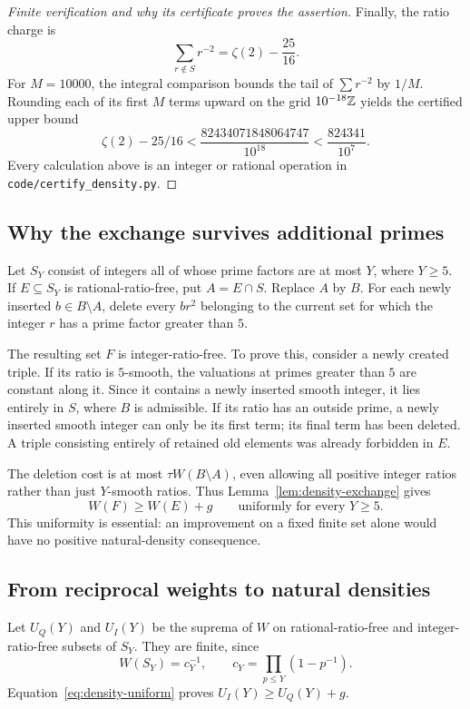 \begin{proof}[Finite verification and why its certificate proves the assertion]
Finally, the ratio charge is
\[
 \sum_{r\notin S}r^{-2}=\zeta(2)-\frac{25}{16}.
\]
For $M=10000$, the integral comparison bounds the tail of
$\sum r^{-2}$ by $1/M$. Rounding each of its first $M$ terms upward on
the grid $10^{-18}\mathbb Z$ yields the certified upper bound
\[
 \zeta(2)-25/16<
 \frac{82434071848064747}{10^{18}}<\frac{824341}{10^7}.
\]
Every calculation above is an integer or rational operation in
\texttt{code/certify\_density.py}.
\end{proof}

\subsection{Why the exchange survives additional primes}
Let $S_Y$ consist of integers all of whose prime factors are at most $Y$,
where $Y\ge5$. If $E\subseteq S_Y$ is rational-ratio-free, put
$A=E\cap S$. Replace $A$ by $B$. For each newly inserted $b\in B\setminus A$,
delete every $br^2$ belonging to the current set for which the integer $r$
has a prime factor greater than $5$.

The resulting set $F$ is integer-ratio-free. To prove this, consider a newly
created triple. If its ratio is $5$-smooth, the valuations at primes greater
than $5$ are constant along it. Since it contains a newly inserted smooth
integer, it lies entirely in $S$, where $B$ is admissible. If its ratio has
an outside prime, a newly inserted smooth integer can only be its first term;
its final term has been deleted. A triple consisting entirely of retained old
elements was already forbidden in $E$.

The deletion cost is at most
$\tau W(B\setminus A)$, even allowing all positive integer ratios rather
than just $Y$-smooth ratios. Thus Lemma~\ref{lem:density-exchange} gives
\begin{equation}\label{eq:density-uniform}
 W(F)\ge W(E)+g
 \qquad\text{uniformly for every }Y\ge5.
\end{equation}
This uniformity is essential: an improvement on a fixed finite set alone
would have no positive natural-density consequence.

\subsection{From reciprocal weights to natural densities}
Let $U_Q(Y)$ and $U_I(Y)$ be the suprema of $W$ on rational-ratio-free and
integer-ratio-free subsets of $S_Y$. They are finite, since
\[
 W(S_Y)=c_Y^{-1},\qquad
 c_Y=\prod_{p\le Y}(1-p^{-1}).
\]
Equation~\eqref{eq:density-uniform} proves $U_I(Y)\ge U_Q(Y)+g$.

